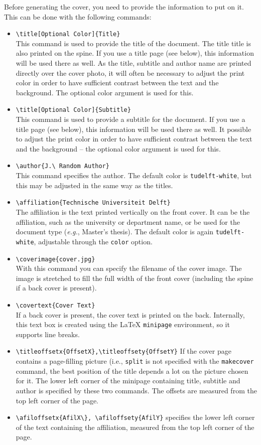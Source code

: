Before generating the cover, you need to provide the information to put on it. This can be done with the following commands:
\begin{itemize}
\item\verb|\title[Optional Color]{Title}| \\
    This command is used to provide the title of the document. The title
    title is also printed on the spine. If you use a title page (see below), this information will be used there as well.
    As the title, subtitle and author name are printed directly over the cover photo, it will often be necessary to adjust the print color in order to have
    sufficient contrast between the text and the background. The optional color argument is used for this.
\item\verb|\title[Optional Color]{Subtitle}| \\
    This command is used to provide a subtitle for the document. If you use a title page (see below), this information will be used there as well.
    It possible to adjust the print color in order to have
    sufficient contrast between the text and the background -- the optional color argument is used for this.
\item\verb|\author{J.\ Random Author}| \\
    This command specifies the author. The default color is \texttt{tudelft-white}, but this may be adjusted in the same way as the titles.
\item\verb|\affiliation{Technische Universiteit Delft}| \\
    The affiliation is the text printed vertically on the front cover. It can be the affiliation, such as the university or department name, or be used for the document type (\emph{e.g.}, Master's thesis). The default color is again \texttt{tudelft-white}, adjustable through the \texttt{color} option.
\item\verb|\coverimage{cover.jpg}| \\
    With this command you can specify the filename of the cover image. The image is stretched to fill the full width of the front cover (including the spine if a back cover is present).
\item\verb|\covertext{Cover Text}| \\
    If a back cover is present, the cover text is printed on the back. Internally, this text box is created using the \LaTeX{} \texttt{minipage} environment, so it supports line breaks.
\item\verb|\titleoffsetx{OffsetX},\titleoffsety{OffsetY}|
    If the cover page contains a page-filling picture (i.e., \texttt{split} is not specified with the \texttt{makecover} command, the best position of the title depends a lot on the picture chosen for it. The lower left corner of the minipage containing title, subtitle and author is 
    specified by these two commands. The offsets are measured from the top left corner of the page. 
\item\verb|\afiloffsetx{AfilX\}, \afiloffsety{AfilY}|
    specifies the lower left corner of the text containing the affiliation, measured from the top left corner of the page. 
\end{itemize}

